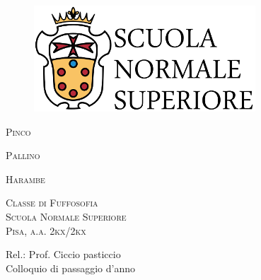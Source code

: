\begin{titlepage}
    \begin{figure}
            \includegraphics[scale=0.45]{images/logosns.png}
            \flushleft
    \end{figure}
    
    \begin{center}  
        \vspace{0.5cm}
        \Huge
        \textsc{Pinco}
            
        \vspace{0.1cm}
        \LARGE
        \textsc{Pallino}
        \vspace{1.5cm}
        
        \Large
        \textsc{Harambe}
        \vspace{2.5cm}
        
        \large
        \textsc{Classe di Fuffosofia}\\
        \textsc{Scuola Normale Superiore}\\
        \textsc{Pisa, a.a. 2kx/2kx}\\
        \vfill
    \end{center}    
    \flushright
    \Large
    Rel.: Prof. Ciccio pasticcio\\
    Colloquio di passaggio d'anno
    
    \vspace{0.8cm}
    
\end{titlepage}